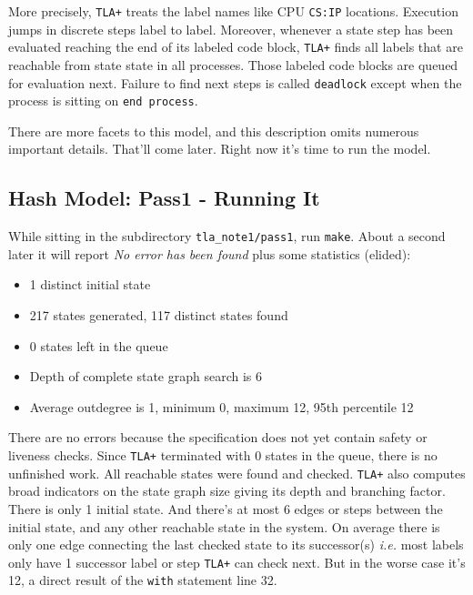 \documentclass[twocolumn]{article}
\begin{document}
More precisely, \texttt{TLA+} treats the label names like CPU \texttt{CS:IP} locations. Execution jumps in discrete steps label to label. Moreover, whenever a state step has been evaluated reaching the end of its labeled code block, \texttt{TLA+} finds all labels that are reachable from state state in all processes. Those labeled code blocks are queued for evaluation next. Failure to find next steps is called \texttt{deadlock} except when the process is sitting on \texttt{end process}. 

There are more facets to this model, and this description omits numerous important details. That'll come later. Right now it's time to run the model.

\subsection{Hash Model: Pass1 - Running It}

While sitting in the subdirectory \texttt{tla\_note1/pass1}, run \texttt{make}. About a second later it will report \emph{No error has been found} plus some statistics (elided):

\begin{itemize}
\item 1 distinct initial state
\item 217 states generated, 117 distinct states found
\item 0 states left in the queue
\item Depth of complete state graph search is 6
\item Average outdegree is 1, minimum 0, maximum 12, 95th percentile 12
\end{itemize}

There are no errors because the specification does not yet contain safety or liveness checks. Since \texttt{TLA+} terminated with 0 states in the queue, there is no unfinished work. All reachable states were found and checked. \texttt{TLA+} also computes broad indicators on the state graph size giving its depth and branching factor. There is only 1 initial state. And there's at most 6 edges or steps between the initial state, and any other reachable state in the system. On average there is only one edge connecting the last checked state to its successor(s) \emph{i.e.} most labels only have 1 successor label or step \texttt{TLA+} can check next. But in the worse case it's 12, a direct result of the \texttt{with} statement line 32.
\end{document}
